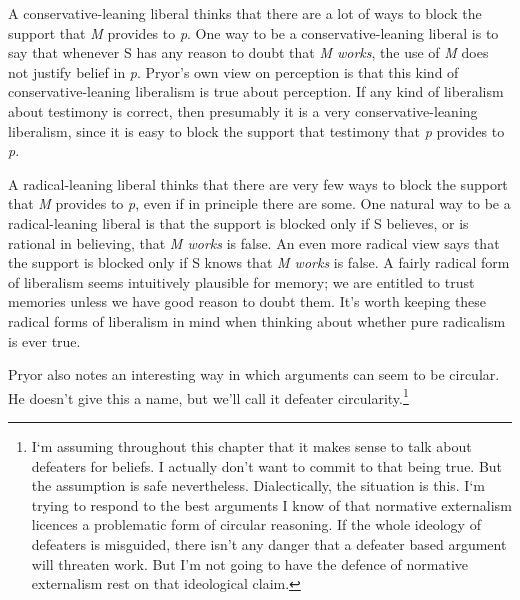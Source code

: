 A conservative-leaning liberal thinks that there are a lot of ways to block the support that \emph{M} provides to \emph{p}. One way to be a conservative-leaning liberal is to say that whenever S has any reason to doubt that \emph{M works}, the use of \emph{M} does not justify belief in \emph{p}. Pryor's own view on perception is that this kind of conservative-leaning liberalism is true about perception. If any kind of liberalism about testimony is correct, then presumably it is a very conservative-leaning liberalism, since it is easy to block the support that testimony that \emph{p} provides to \emph{p}.

A radical-leaning liberal thinks that there are very few ways to block the support that \emph{M} provides to \emph{p}, even if in principle there are some. One natural way to be a radical-leaning liberal is that the support is blocked only if S believes, or is rational in believing, that \emph{M works} is false. An even more radical view says that the support is blocked only if S knows that \emph{M works} is false. A fairly radical form of liberalism seems intuitively plausible for memory; we are entitled to trust memories unless we have good reason to doubt them. It's worth keeping these radical forms of liberalism in mind when thinking about whether pure radicalism is ever true.

Pryor also notes an interesting way in which arguments can seem to be circular. He doesn't give this a name, but we'll call it defeater circularity.\footnote{I`m assuming throughout this chapter that it makes sense to talk about defeaters for beliefs. I actually don't want to commit to that being true. But the assumption is safe nevertheless. Dialectically, the situation is this. I`m trying to respond to the best arguments I know of that normative externalism licences a problematic form of circular reasoning. If the whole ideology of defeaters is misguided, there isn't any danger that a defeater based argument will threaten work. But I'm not going to have the defence of normative externalism rest on that ideological claim.}

